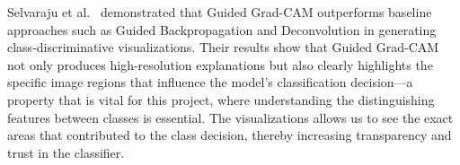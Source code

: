\documentclass[a4paper,12pt]{report}
\begin{document}

Selvaraju et al.\ \citep{Selvaraju_2019} demonstrated that Guided Grad-CAM outperforms baseline approaches such as Guided Backpropagation and Deconvolution in generating class-discriminative visualizations. Their results show that Guided Grad-CAM not only produces high-resolution explanations but also clearly highlights the specific image regions that influence the model's classification decision---a property that is vital for this project, where understanding the distinguishing features between classes is essential. The visualizations allows us to see the exact areas that contributed to the class decision, thereby increasing transparency and trust in the classifier.





\end{document}
